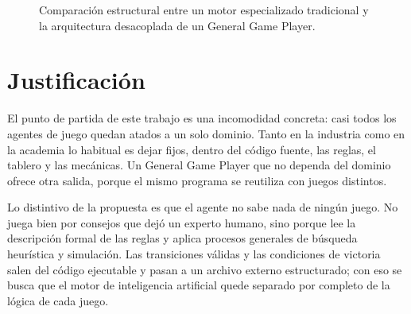 \begin{figure}[H]
\caption{Comparación estructural entre un motor especializado tradicional y la arquitectura desacoplada de un General Game Player.}
\label{fig:comparativa_arquitectura_ggp}
\end{figure}

\section{Justificación}

El punto de partida de este trabajo es una incomodidad concreta: casi todos los agentes de juego quedan atados a un solo dominio. Tanto en la industria como en la academia lo habitual es dejar fijos, dentro del código fuente, las reglas, el tablero y las mecánicas. Un General Game Player que no dependa del dominio ofrece otra salida, porque el mismo programa se reutiliza con juegos distintos.

Lo distintivo de la propuesta es que el agente no sabe nada de ningún juego. No juega bien por consejos que dejó un experto humano, sino porque lee la descripción formal de las reglas y aplica procesos generales de búsqueda heurística y simulación. Las transiciones válidas y las condiciones de victoria salen del código ejecutable y pasan a un archivo externo estructurado; con eso se busca que el motor de inteligencia artificial quede separado por completo de la lógica de cada juego.

